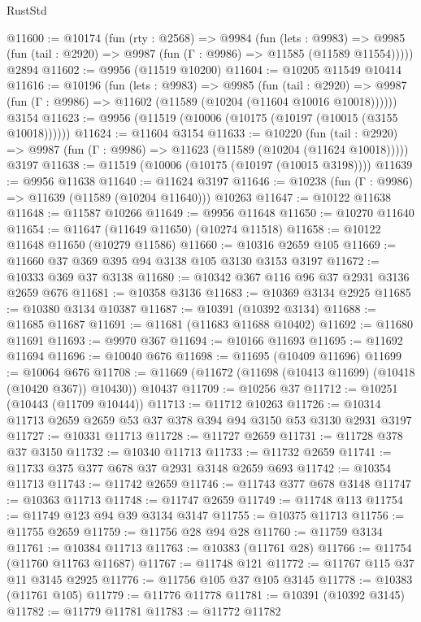 \begin{lexlean}{RustStd}
\begin{coremodule}
@11600 := @10174
    (fun (rty : @2568) =>
    @9984
      (fun (lets : @9983) =>
      @9985 (fun (tail : @2920) => @9987 (fun (Γ : @9986) => @11585 (@11589 @11554)))))
    @2894
@11602 := @9956 (@11519 @10200)
@11604 := @10205 @11549 @10414
@11616 := @10196
    (fun (lets : @9983) =>
    @9985
      (fun (tail : @2920) =>
      @9987 (fun (Γ : @9986) => @11602 (@11589 (@10204 (@11604 @10016 @10018))))))
    @3154
@11623 := @9956 (@11519 (@10006 (@10175 (@10197 (@10015 (@3155 @10018))))))
@11624 := @11604 @3154
@11633 := @10220
    (fun (tail : @2920) => @9987 (fun (Γ : @9986) => @11623 (@11589 (@10204 (@11624 @10018)))))
    @3197
@11638 := @11519 (@10006 (@10175 (@10197 (@10015 @3198))))
@11639 := @9956 @11638
@11640 := @11624 @3197
@11646 := @10238 (fun (Γ : @9986) => @11639 (@11589 (@10204 @11640))) @10263
@11647 := @10122 @11638
@11648 := @11587 @10266
@11649 := @9956 @11648
@11650 := @10270 @11640
@11654 := @11647 (@11649 @11650) (@10274 @11518)
@11658 := @10122 @11648 @11650 (@10279 @11586)
@11660 := @10316 @2659 @105
@11669 := @11660 @37 @369 @395 @94 @3138 @105 @3130 @3153 @3197
@11672 := @10333 @369 @37 @3138
@11680 := @10342 @367 @116 @96 @37 @2931 @3136 @2659 @676
@11681 := @10358 @3136
@11683 := @10369 @3134 @2925
@11685 := @10380 @3134 @10387
@11687 := @10391 (@10392 @3134)
@11688 := @11685 @11687
@11691 := @11681 (@11683 @11688 @10402)
@11692 := @11680 @11691
@11693 := @9970 @367
@11694 := @10166 @11693
@11695 := @11692 @11694
@11696 := @10040 @676
@11698 := @11695 (@10409 @11696)
@11699 := @10064 @676
@11708 := @11669 (@11672 (@11698 (@10413 @11699) (@10418 (@10420 @367)) @10430)) @10437
@11709 := @10256 @37
@11712 := @10251 (@10443 (@11709 @10444))
@11713 := @11712 @10263
@11726 := @10314 @11713 @2659 @2659 @53 @37 @378 @394 @94 @3150 @53 @3130 @2931 @3197
@11727 := @10331 @11713
@11728 := @11727 @2659
@11731 := @11728 @378 @37 @3150
@11732 := @10340 @11713
@11733 := @11732 @2659
@11741 := @11733 @375 @377 @678 @37 @2931 @3148 @2659 @693
@11742 := @10354 @11713
@11743 := @11742 @2659
@11746 := @11743 @377 @678 @3148
@11747 := @10363 @11713
@11748 := @11747 @2659
@11749 := @11748 @113
@11754 := @11749 @123 @94 @39 @3134 @3147
@11755 := @10375 @11713
@11756 := @11755 @2659
@11759 := @11756 @28 @94 @28
@11760 := @11759 @3134
@11761 := @10384 @11713
@11763 := @10383 (@11761 @28)
@11766 := @11754 (@11760 @11763 @11687)
@11767 := @11748 @121
@11772 := @11767 @115 @37 @11 @3145 @2925
@11776 := @11756 @105 @37 @105 @3145
@11778 := @10383 (@11761 @105)
@11779 := @11776 @11778
@11781 := @10391 (@10392 @3145)
@11782 := @11779 @11781
@11783 := @11772 @11782

\end{coremodule}
\end{lexlean}
